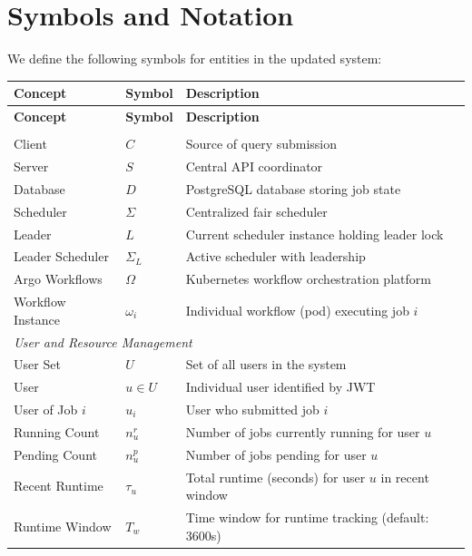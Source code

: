 \documentclass[11pt]{article}
\begin{document}
\section{Symbols and Notation}
\label{sec:symbols-notation}

We define the following symbols for entities in the updated system:

\begin{center}
  \begin{longtable}{p{4cm}p{2.5cm}p{7.5cm}}
    \toprule
    \textbf{Concept} & \textbf{Symbol} & \textbf{Description} \\
    \midrule
    \endfirsthead

    \toprule
    \textbf{Concept} & \textbf{Symbol} & \textbf{Description} \\
    \midrule
    \endhead

    \midrule
    \endfoot

    \bottomrule
    \endlastfoot

    \multicolumn{3}{l}{\textit{Core Components}} \\
    Client & $C$ & Source of query submission \\
    Server & $S$ & Central API coordinator \\
    Database & $D$ & PostgreSQL database storing job state \\
    Scheduler & $\Sigma$ & Centralized fair scheduler \\
    Leader & $L$ & Current scheduler instance holding leader lock \\
    Leader Scheduler & $\Sigma_L$ & Active scheduler with leadership \\
    Argo Workflows & $\Omega$ & Kubernetes workflow orchestration platform \\
    Workflow Instance & $\omega_i$ & Individual workflow (pod) executing job $i$ \\
    \midrule

    \multicolumn{3}{l}{\textit{User and Resource Management}} \\
    User Set & $U$ & Set of all users in the system \\
    User & $u \in U$ & Individual user identified by JWT \\
    User of Job $i$ & $u_i$ & User who submitted job $i$ \\
    Running Count & $n_u^r$ & Number of jobs currently running for user $u$ \\
    Pending Count & $n_u^p$ & Number of jobs pending for user $u$ \\
    Recent Runtime & $\tau_u$ & Total runtime (seconds) for user $u$ in recent window \\
    Runtime Window & $T_w$ & Time window for runtime tracking (default: 3600s) \\
    \midrule


\end{longtable}
\end{center}
\end{document}
